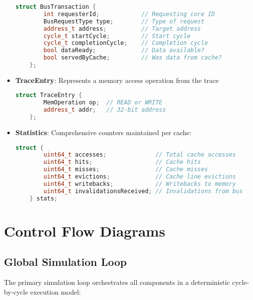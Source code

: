 \documentclass[11pt]{article}
\begin{document}
\begin{itemize}
    \begin{lstlisting}[language=C++]
    struct BusTransaction {
        int requesterId;            // Requesting core ID
        BusRequestType type;        // Type of request
        address_t address;          // Target address
        cycle_t startCycle;         // Start cycle
        cycle_t completionCycle;    // Completion cycle
        bool dataReady;             // Data available?
        bool servedByCache;         // Was data from cache?
    };
    \end{lstlisting}
    
    \item \textbf{TraceEntry}: Represents a memory access operation from the trace
    
    \begin{lstlisting}[language=C++]
    struct TraceEntry { 
        MemOperation op;  // READ or WRITE
        address_t addr;   // 32-bit address
    };
    \end{lstlisting}
    
    \item \textbf{Statistics}: Comprehensive counters maintained per cache:
    
    \begin{lstlisting}[language=C++]
    struct {
        uint64_t accesses;              // Total cache accesses
        uint64_t hits;                  // Cache hits
        uint64_t misses;                // Cache misses
        uint64_t evictions;             // Cache line evictions
        uint64_t writebacks;            // Writebacks to memory
        uint64_t invalidationsReceived; // Invalidations from bus
    } stats;
    \end{lstlisting}
\end{itemize}

\section{Control Flow Diagrams}

\subsection{Global Simulation Loop}
The primary simulation loop orchestrates all components in a deterministic cycle-by-cycle execution model:
\end{document}
